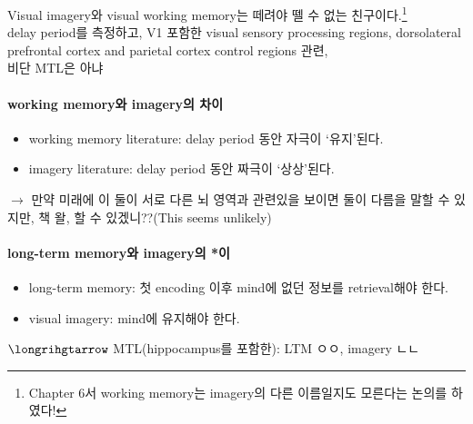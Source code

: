 \documentclass[../note.tex]{subfiles}
\begin{document}
Visual imagery와 visual working memory는 떼려야 뗄 수 없는 친구이다.\footnote{Chapter 6서 working memory는 imagery의 다른 이름일지도 모른다는 논의를 하였다!}\\
delay period를 측정하고, V1 포함한 visual sensory processing regions, dorsolateral prefrontal cortex and parietal cortex control regions 관련,\\
비단 MTL은 아냐\\

\paragraph{working memory와 imagery의 차이}
\begin{itemize}
  \item working memory literature: delay period 동안 자극이 `유지'된다.
  \item imagery literature: delay period 동안 짜극이 `상상'된다.
\end{itemize}
$\longrightarrow$ 만약 미래에 이 둘이 서로 다른 뇌 영역과 관련있을 보이면 둘이 다름을 말할 수 있지만, 책 왈, 할 수 있겠니??(This seems unlikely)

\paragraph{long-term memory와 imagery의 *이}
\begin{itemize}
  \item long-term memory: 첫 encoding 이후 mind에 없던 정보를 retrieval해야 한다.
  \item visual imagery: mind에 유지해야 한다.
\end{itemize}
$\longrihgtarrow$ MTL(hippocampus를 포함한): LTM ㅇㅇ, imagery ㄴㄴ\\
\end{document}

